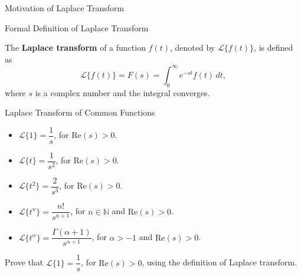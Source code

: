\documentclass[12pt, a4paper]{article}
\begin{document}
\FrontPage
\Large

\begin{heading}
	Motivation of Laplace Transform
\end{heading}

\clearpage

\begin{heading}
	Formal Definition of Laplace Transform
\end{heading}

\vspace{10pt}

\begin{definition}
	The \textbf{Laplace transform} of a function $f(t)$, denoted by $\mathcal{L}\{f(t)\}$, is defined as
	\[
		\mathcal{L}\{f(t)\} = F(s) = \int_0^\infty e^{-st} f(t) \, dt,
	\]
	where $s$ is a complex number and the integral converges.
\end{definition}

\clearpage	

\begin{heading}
	Laplace Transform of Common Functions
\end{heading}

\vspace{10pt}

\begin{definition}
	\begin{itemize}
		\item $\mathcal{L}\{1\} = \dfrac{1}{s}$, for $\text{Re}(s) > 0$.
		\item $\mathcal{L}\{t\} = \dfrac{1}{s^2}$, for $\text{Re}(s) > 0$.
		\item $\mathcal{L}\{t^2\} = \dfrac{2}{s^3}$, for $\text{Re}(s) > 0$.
		\item $\mathcal{L}\{t^n\} = \dfrac{n!}{s^{n+1}}$, for $n \in \mathbb{N}$ and $\text{Re}(s) > 0$.
		\item $\mathcal{L}\{t^\alpha\} = \dfrac{\Gamma(\alpha + 1)}{s^{\alpha + 1}}$, for $\alpha > -1$ and $\text{Re}(s) > 0$.
	\end{itemize}
\end{definition}

\vspace{20pt}

\begin{problem}
	Prove that $\mathcal{L}\{1\} = \dfrac{1}{s}$, for $\text{Re}(s) > 0$, using the definition of Laplace transform. 
\end{problem}
\end{document}
